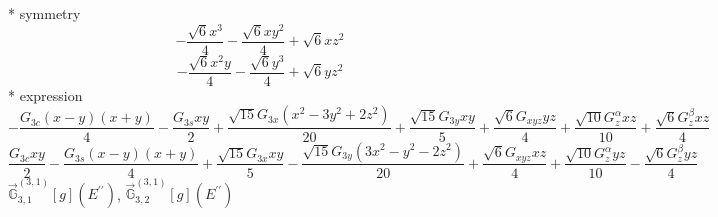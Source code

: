 \documentclass[fleqn,8pt]{jsarticle}
\begin{document}
\noindent\quad ** symmetry
\begin{dmath*}
- \frac{\sqrt{6} x^{3}}{4} - \frac{\sqrt{6} x y^{2}}{4} + \sqrt{6} x z^{2}
\end{dmath*}
\begin{dmath*}
- \frac{\sqrt{6} x^{2} y}{4} - \frac{\sqrt{6} y^{3}}{4} + \sqrt{6} y z^{2}
\end{dmath*}
\noindent\quad ** expression
\begin{dmath*}
- \frac{G_{3c} \left(x - y\right) \left(x + y\right)}{4} - \frac{G_{3s} x y}{2} + \frac{\sqrt{15} G_{3x} \left(x^{2} - 3 y^{2} + 2 z^{2}\right)}{20} + \frac{\sqrt{15} G_{3y} x y}{5} + \frac{\sqrt{6} G_{xyz} y z}{4} + \frac{\sqrt{10} G_{z}^{\alpha} x z}{10} + \frac{\sqrt{6} G_{z}^{\beta} x z}{4}
\end{dmath*}
\begin{dmath*}
\frac{G_{3c} x y}{2} - \frac{G_{3s} \left(x - y\right) \left(x + y\right)}{4} + \frac{\sqrt{15} G_{3x} x y}{5} - \frac{\sqrt{15} G_{3y} \left(3 x^{2} - y^{2} - 2 z^{2}\right)}{20} + \frac{\sqrt{6} G_{xyz} x z}{4} + \frac{\sqrt{10} G_{z}^{\alpha} y z}{10} - \frac{\sqrt{6} G_{z}^{\beta} y z}{4}
\end{dmath*}
\noindent\quad $\vec{\mathbb{G}}_{3,1}^{(3,1)}[g](E^{\prime\prime})$, $\vec{\mathbb{G}}_{3,2}^{(3,1)}[g](E^{\prime\prime})$
\end{document}
